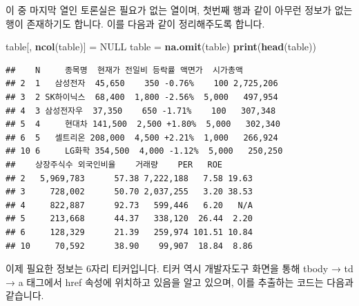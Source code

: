 \documentclass[12pt,]{book}
\newenvironment{Shaded}{\begin{snugshade}}{\end{snugshade}}
\newcommand{\DataTypeTok}[1]{\textcolor[rgb]{0.13,0.29,0.53}{#1}}
\newcommand{\DecValTok}[1]{\textcolor[rgb]{0.00,0.00,0.81}{#1}}
\newcommand{\KeywordTok}[1]{\textcolor[rgb]{0.13,0.29,0.53}{\textbf{#1}}}
\newcommand{\NormalTok}[1]{#1}
\newcommand{\OperatorTok}[1]{\textcolor[rgb]{0.81,0.36,0.00}{\textbf{#1}}}
\newcommand{\OtherTok}[1]{\textcolor[rgb]{0.56,0.35,0.01}{#1}}
\newcommand{\StringTok}[1]{\textcolor[rgb]{0.31,0.60,0.02}{#1}}
\begin{document}
이 중 마지막 열인 토론실은 필요가 없는 열이며, 첫번째 행과 같이 아무런 정보가 없는 행이 존재하기도 합니다. 이를 다음과 같이 정리해주도록 합니다.

\begin{Shaded}
\begin{Highlighting}[]
\NormalTok{table[, }\KeywordTok{ncol}\NormalTok{(table)] =}\StringTok{ }\OtherTok{NULL}
\NormalTok{table =}\StringTok{ }\KeywordTok{na.omit}\NormalTok{(table)}
\KeywordTok{print}\NormalTok{(}\KeywordTok{head}\NormalTok{(table))}
\end{Highlighting}
\end{Shaded}

\begin{verbatim}
##    N     종목명  현재가 전일비 등락률 액면가  시가총액
## 2  1   삼성전자  45,650    350 -0.76%    100 2,725,206
## 3  2 SK하이닉스  68,400  1,800 -2.56%  5,000   497,954
## 4  3 삼성전자우  37,350    650 -1.71%    100   307,348
## 5  4     현대차 141,500  2,500 +1.80%  5,000   302,340
## 6  5   셀트리온 208,000  4,500 +2.21%  1,000   266,924
## 10 6     LG화학 354,500  4,000 -1.12%  5,000   250,250
##    상장주식수 외국인비율    거래량    PER   ROE
## 2   5,969,783      57.38 7,222,188   7.58 19.63
## 3     728,002      50.70 2,037,255   3.20 38.53
## 4     822,887      92.73   599,446   6.20   N/A
## 5     213,668      44.37   338,120  26.44  2.20
## 6     128,329      21.39   259,974 101.51 10.84
## 10     70,592      38.90    99,907  18.84  8.86
\end{verbatim}

이제 필요한 정보는 6자리 티커입니다. 티커 역시 개발자도구 화면을 통해 tbody → td → a 태그에서 href 속성에 위치하고 있음을 알고 있으며, 이를 추출하는 코드는 다음과 같습니다.

\begin{Shaded}
\end{Shaded}
\end{document}
